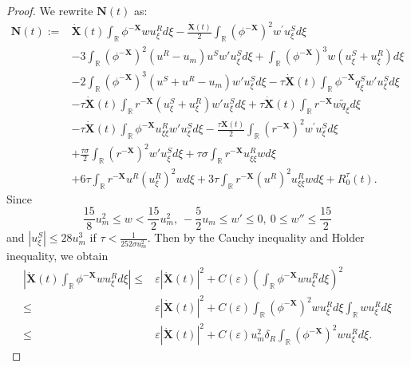 \documentclass[10pt,reqno]{amsart}
\numberwithin{equation}{section}
\begin{document}
	\begin{proof}
		We rewrite $\mathbf{N}(t)$ as:
		\begin{align*}
			\mathbf{N}(t):=&\dot{\mathbf{X}}(t) \int_{\mathbb{R}} \phi^{-\mathbf{X}} w u_{\xi}^{R} d\xi-\frac{\dot{\mathbf{X}}(t)}{2} \int_{\mathbb{R}}\left(\phi^{-\mathbf{X}}\right)^{2} w^{\prime} u_{\xi}^{S} d \xi\nonumber\\
			&-3\int_{\mathbb{R}}(\phi^{-\mathbf{X}})^2(u^R-u_{m})u^Sw'u_{\xi}^Sd\xi+\int_{\mathbb{R}}(\phi^{-\mathbf{X}})^3w(u_{\xi}^S+u_{\xi}^R)d\xi\\
			&-2\int_{\mathbb{R}}(\phi^{-\mathbf{X}})^3(u^S+u^R-u_{m})w'u_{\xi}^Sd\xi-\tau\dot{\mathbf{X}}(t)\int_{\mathbb{R}}\phi^{-\mathbf{X}}q_{\xi}^{S}w'u_{\xi}^{S}d\xi\\
			&-\tau\dot{\mathbf{X}}(t) \int_{\mathbb{R}}r^{-\mathbf{X}}\left(u_{\xi}^{S}+u_{\xi}^{R}\right)w'u_{\xi}^{S}d\xi+\tau\dot{\mathbf{X}}(t)\int_{\mathbb{R}}r^{-\mathbf{X}}w\tilde{q}_{\xi}d\xi\\
			&-\tau\dot{\mathbf{X}}(t)\int_{\mathbb{R}}\phi^{-\mathbf{X}}u_{\xi\xi}^{R}w'u_{\xi}^{S}d\xi-\frac{\tau\dot{\mathbf{X}}(t)}{2}\int_{\mathbb{R}}\left(r^{-\mathbf{X}}\right)^{2} w^{\prime} u_{\xi}^{S} d \xi\nonumber\\
			&+\frac{\tau\sigma}{2}\int_{\mathbb{R}}(r^{-\mathbf{X}})^2w'u_{\xi}^Sd\xi+\tau\sigma\int_{\mathbb{R}}r^{-\mathbf{X}}u_{\xi\xi}^Rwd\xi\nonumber\\
			&+6\tau\int_{\mathbb{R}}r^{-\mathbf{X}}u^R(u_{\xi}^R)^2wd\xi+3\tau\int_{\mathbb{R}}r^{-\mathbf{X}}(u^R)^2u_{\xi\xi}^Rwd\xi+R_0^{\tau}(t).
		\end{align*}
		Since $$\frac{15}{8}u_m^2\leq w < \frac{15}{2}u_m^2,\ -\frac{5}{2}u_m\leq w'\leq0,\ 0\leq w''\leq\frac{15}{2}$$ and $|u_{\xi}^S|\leq28u_m^3$ if $\tau<\frac{1}{252\sigma u_m^2}$. Then by the Cauchy inequality and H$\ddot{\text{o}}$lder inequality, we obtain
		\begin{equation}\label{N1}
			\begin{aligned}
				\left|\dot{\mathbf{X}}(t) \int_{\mathbb{R}} \phi^{-\mathbf{X}} w u_{\xi}^{R} d\xi\right|\leq &\varepsilon\left|\dot{{\mathbf{X}}}(t)\right|^2+C(\varepsilon)\left(\int_{\mathbb{R}}\phi^{-\mathbf{X}}wu_{\xi}^Rd\xi\right)^2\\
				\leq&\varepsilon\left|\dot{{\mathbf{X}}}(t)\right|^2+C(\varepsilon)\int_{\mathbb{R}}\left(\phi^{-\mathbf{X}}\right)^2wu_{\xi}^Rd\xi\int_{\mathbb{R}}wu_{\xi}^Rd\xi\\
				\leq&\varepsilon\left|\dot{{\mathbf{X}}}(t)\right|^2+C(\varepsilon)u_{m}^2\delta_R\int_{\mathbb{R}}\left(\phi^{-\mathbf{X}}\right)^2wu_{\xi}^Rd\xi.

\end{aligned}
\end{equation}
\end{proof}
\end{document}
